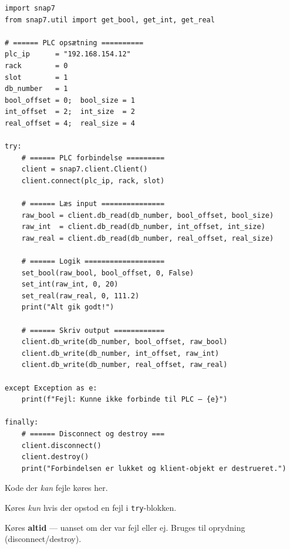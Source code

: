 \documentclass[12pt, a4paper]{article}
\begin{document}
\begin{tcolorbox}[pythonbox, title={\faPython\quad Kode 5 — Robust fejlhåndtering}]
\begin{verbatim}
import snap7
from snap7.util import get_bool, get_int, get_real

# ====== PLC opsætning ==========
plc_ip      = "192.168.154.12"
rack        = 0
slot        = 1
db_number   = 1
bool_offset = 0;  bool_size = 1
int_offset  = 2;  int_size  = 2
real_offset = 4;  real_size = 4

try:
    # ====== PLC forbindelse =========
    client = snap7.client.Client()
    client.connect(plc_ip, rack, slot)

    # ====== Læs input ===============
    raw_bool = client.db_read(db_number, bool_offset, bool_size)
    raw_int  = client.db_read(db_number, int_offset, int_size)
    raw_real = client.db_read(db_number, real_offset, real_size)

    # ====== Logik ===================
    set_bool(raw_bool, bool_offset, 0, False)
    set_int(raw_int, 0, 20)
    set_real(raw_real, 0, 111.2)
    print("Alt gik godt!")

    # ====== Skriv output ============
    client.db_write(db_number, bool_offset, raw_bool)
    client.db_write(db_number, int_offset, raw_int)
    client.db_write(db_number, real_offset, raw_real)

except Exception as e:
    print(f"Fejl: Kunne ikke forbinde til PLC — {e}")

finally:
    # ====== Disconnect og destroy ===
    client.disconnect()
    client.destroy()
    print("Forbindelsen er lukket og klient-objekt er destrueret.")
\end{verbatim}
\end{tcolorbox}

\begin{tcolorbox}[infobox, title={\faInfoCircle\quad try / except / finally forklaret}]
\begin{description}[leftmargin=2cm, style=nextline]
  \item[\texttt{try}] Kode der \textit{kan} fejle køres her.
  \item[\texttt{except}] Køres \textit{kun} hvis der opstod en fejl i \texttt{try}-blokken.
  \item[\texttt{finally}] Køres \textbf{altid} — uanset om der var fejl eller ej.
    Bruges til oprydning (disconnect/destroy).
\end{description}
\end{tcolorbox}
\end{document}
